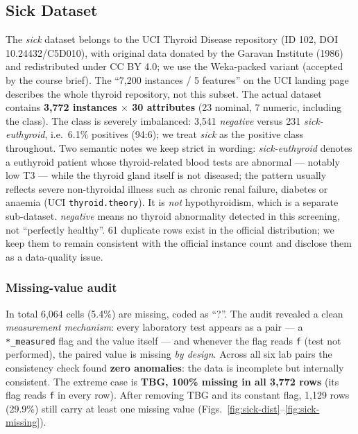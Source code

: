 
\subsection{Sick Dataset}
\label{sec:sick-data}

The \textit{sick} dataset belongs to the UCI Thyroid Disease repository
(ID 102, DOI 10.24432/C5D010), with original data donated by the Garavan
Institute (1986) and redistributed under CC BY 4.0; we use the Weka-packed
variant (accepted by the course brief). The ``7,200 instances / 5
features'' on the UCI landing page describes the whole thyroid
repository, not this subset. The actual dataset contains
\textbf{3,772 instances $\times$ 30 attributes} (23 nominal, 7 numeric,
including the class). The class is severely imbalanced: 3,541
\textit{negative} versus 231 \textit{sick-euthyroid}, i.e.\ 6.1\%
positives (94:6); we treat \textit{sick} as the positive class
throughout. Two semantic notes we keep strict in wording:
\textit{sick-euthyroid} denotes a euthyroid patient whose
thyroid-related blood tests are abnormal --- notably low T3 --- while the
thyroid gland itself is not diseased; the pattern usually reflects severe
non-thyroidal illness such as chronic renal failure, diabetes or anaemia
(UCI \texttt{thyroid.theory}). It is \emph{not} hypothyroidism, which is a
separate sub-dataset. \textit{negative} means no thyroid abnormality
detected in this screening, not ``perfectly healthy''. 61
duplicate rows exist in the official distribution; we keep them to remain
consistent with the official instance count and disclose them as a
data-quality issue.

\subsubsection{Missing-value audit}
In total 6,064 cells (5.4\%) are missing, coded as ``?''. The audit
revealed a clean \emph{measurement mechanism}: every laboratory test
appears as a pair --- a \texttt{*\_measured} flag and the value itself ---
and whenever the flag reads \texttt{f} (test not performed), the paired
value is missing \emph{by design}. Across all six lab pairs the
consistency check found \textbf{zero anomalies}: the data is incomplete
but internally consistent. The extreme case is \textbf{TBG, 100\% missing
in all 3,772 rows} (its flag reads \texttt{f} in every row). After
removing TBG and its constant flag, 1,129 rows
(29.9\%) still carry at least one missing value
(Figs.~\ref{fig:sick-dist}--\ref{fig:sick-missing}).

